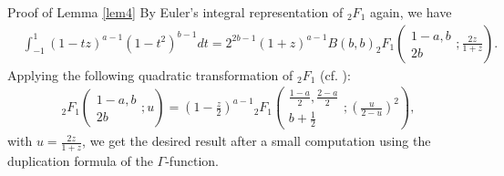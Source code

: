 \documentclass[12pt]{article}
\numberwithin{equation}{section}
\newenvironment{proof*}[1]{\noindent\textbf{#1\ }}{\hspace*{\fill}$\Box$\medskip}
\begin{document}
\begin{proof*}{Proof of Lemma \ref{lem4}}
  By Euler's integral representation of $_2 F_1$ again, we have
  \begin{eqnarray}
    & \displaystyle\int_{- 1}^1 (1 - t z)^{a - 1} (1 - t^2)^{b - 1} d t = 2^{2 b - 1} (1 +
    z)^{a - 1} B (b, b)_2 F_1 \left( \begin{array}{c}
      1 - a, b\\
      2 b
    \end{array} ; \frac{2 z}{1 + z} \right) .  \label{eqn:quad} & 
  \end{eqnarray}
  Applying the following quadratic transformation of $_2 F_1$ (cf. {\cite[Thm.
  3.13]{andrews2000special}}):
  \begin{eqnarray}
    & \;_2 F_1 \left( \begin{array}{c}
      \displaystyle1 - a, b\\
      2 b
    \end{array} ; u \right) = \left( 1 - \frac{z}{2} \right)^{a - 1}{}_2 F_1
    \left( \begin{array}{c}
      \displaystyle\frac{1 - a}{2}, \frac{2 - a}{2}\\
      b + \frac{1}{2}
    \end{array} ; \displaystyle\left( \frac{u}{2 - u} \right)^2 \right), &  \nonumber
  \end{eqnarray}
  with $u = \frac{2 z}{1 + z}$, we get the desired result after a small
  computation using the duplication formula of the $\Gamma$-function.
\end{proof*}
\end{document}
